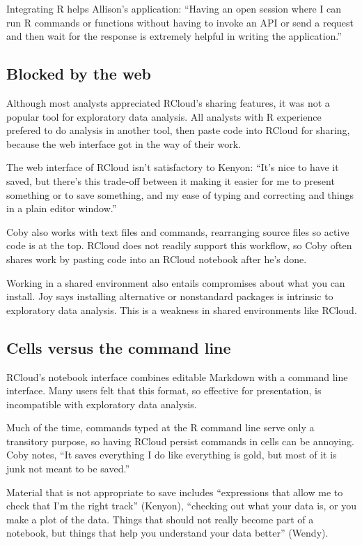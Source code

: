 Integrating R helps Allison's application: ``Having an open session where I can run R commands or
functions without having to invoke an API or send a request and then
wait for the response is extremely helpful in writing the application.''

\subsection{Blocked by the web}

Although most analysts appreciated RCloud's sharing features,
it was not a popular tool for exploratory data analysis.
All analysts with R experience prefered to do analysis in another
tool, then paste code into RCloud for sharing, because the web interface got in the
way of their work.

The web interface of RCloud isn't satisfactory to Kenyon: ``It's nice to have
it saved, but there's this trade-off between it making it easier for me to
present something or to save something, and my ease of typing and
correcting and things in a plain editor window.''

Coby also works with text files and commands, rearranging source files
so active code is at the top. RCloud does not readily support this
workflow, so Coby often shares work by pasting code into an RCloud
notebook after he's done.

Working in a shared environment also entails compromises about what you can
install. Joy says installing alternative or nonstandard packages is
intrinsic to exploratory data analysis. This is a weakness in shared
environments like RCloud.


\subsection{Cells versus the command line}
RCloud's notebook interface combines editable Markdown with a command line
interface. Many users felt that this format, so effective for presentation,
is incompatible with exploratory data analysis.

Much of the time, commands typed at the R command line serve only a transitory
purpose, so having RCloud persist commands in cells can be annoying.
Coby notes, ``It saves everything I do like everything is gold, but most
of it is junk not meant to be saved.''

Material that is not appropriate to save includes ``expressions that allow
me to check that I'm the right track'' (Kenyon), ``checking out what your data is,
or you make a plot of the data. Things that should not really become part of a
notebook, but things that help you understand your data better'' (Wendy).

